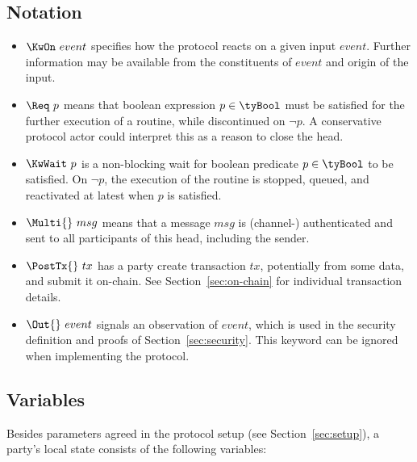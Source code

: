 \subsection{Notation}
\begin{itemize}
	\item $\KwOn~event$ specifies how the protocol reacts on a given input
	      $event$. Further information may be available from the constituents of
	      $event$ and origin of the input.
	\item $\Req~p$ means that boolean expression $p \in \tyBool$ must be satisfied
	      for the further execution of a routine, while discontinued on $\neg p$. A
	      conservative protocol actor could interpret this as a reason to close
	      the head.
	\item $\KwWait~p$ is a non-blocking wait for boolean predicate $p \in \tyBool$
	      to be satisfied. On $\neg p$, the execution of the routine is stopped,
	      queued, and reactivated at latest when $p$ is satisfied.
	\item $\Multi{}~msg$ means that a message $msg$ is (channel-) authenticated
	      and sent to all participants of this head, including the sender.
	\item $\PostTx{}~tx$ has a party create transaction $tx$, potentially from
	      some data, and submit it on-chain. See Section~\ref{sec:on-chain} for
	      individual transaction details.
	\item $\Out{}~event$ signals an observation of $event$, which is used in the
	      security definition and proofs of Section~\ref{sec:security}. This
	      keyword can be ignored when implementing the protocol.
\end{itemize}

\subsection{Variables}

Besides parameters agreed in the protocol setup (see Section~\ref{sec:setup}), a
party's local state consists of the following variables:

